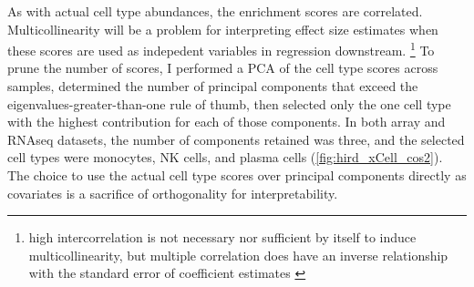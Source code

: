 As with actual cell type abundances, the enrichment scores are correlated.
Multicollinearity will be a problem for interpreting effect size estimates when these scores are used as indepedent variables in regression downstream.
\footnote{high intercorrelation is not necessary nor sufficient by itself to induce multicollinearity, but multiple correlation does have an inverse relationship with the standard error of coefficient estimates \autocite{maddala1992IntroductionEconometrics}}
To prune the number of scores, I performed a \gls{PCA} of the cell type scores across samples,
determined the number of principal components that exceed the eigenvalues-greater-than-one rule of thumb\autocite{kanyongo2005InfluenceReliabilityFour},
then selected only the one cell type with the highest contribution for each of those components.
In both array and \gls{RNAseq} datasets, the number of components retained was three, and the selected cell types were monocytes, \gls{NK} cells, and plasma cells (\autoref{fig:hird_xCell_cos2}).
The choice to use the actual cell type scores over principal components directly as covariates is a sacrifice of orthogonality for interpretability.

